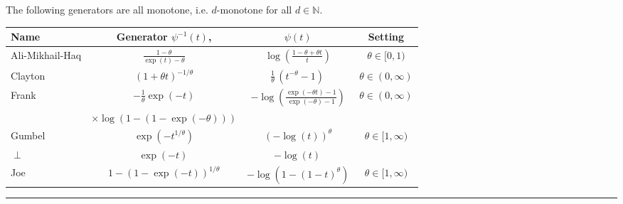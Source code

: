 \begin{f}[Copula]
The following generators are all monotone, i.e. \(d\)-monotone for all \(d\in\mathbb{N}\).

\footnotesize
\renewcommand\arraystretch{1.3}
\begin{tabular}{|m{10mm}|ccc|}	\rowcolor{BleuProfondIRA!40} 
	\hline
 Name 		& Generator \(\psi^{-1}(t)\), 	& \(\psi(t)\) &	Setting\\
	\hline
	Ali-Mikhail-Haq 	&\(\frac{1-\theta}{\exp(t)-\theta} \)	
	&\(\log\left(\frac{1-\theta+\theta t}{t}\right)\) 	
	&\(\theta\in[0,1)\)\\
	Clayton		&\(\left(1+\theta t\right)^{-1/\theta} 	\)
	&\(\frac1\theta\,(t^{-\theta}-1)\, 	\)
	&\(\theta\in(0,\infty)\)\\
	Frank 		&\(-\frac{1}{\theta}\exp(-t)\)
	&\(-\log\left(\frac{\exp(-\theta t)-1}{\exp(-\theta)-1}\right)\)
	&\(\theta\in(0,\infty)\)\\
	&\(\times\log(1-(1-\exp(-\theta)))\)
	&
	&\\
	Gumbel 		&\(\exp\left(-t^{1/\theta}\right) \)	
	&\(\left(-\log(t)\right)^\theta\)	
	&\(\theta\in[1,\infty)\)\\
	\(\perp\) 	&\(\exp(-t)\,\)
	&\(-\log(t)\,\) 	
	& \\
	Joe		&\(1-\left(1-\exp(-t)\right)^{1/\theta}\)
	&\(-\log\left(1-(1-t)^\theta\right)\)
	&\(\theta\in[1,\infty)\)\\
	\hline
\end{tabular}
\renewcommand\arraystretch{1}
\end{f}
\hrule

